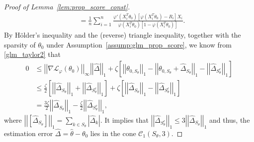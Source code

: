 \documentclass[ejsv2,noshowframe]{imsart}
\theoremstyle{plain}
\theoremstyle{definition}
\theoremstyle{remark}
\newcommand{\norm}[1]{\left|\left| #1 \right|\right|}
\renewcommand{\hat}{\widehat}
\begin{document}
\begin{proof}[Proof of Lemma~\ref{lem:prop_score_const}]
\begin{align*}
		&= \frac{1}{n} \sum_{i=1}^n \frac{\varphi'(X_i^T\theta_0)\left[\varphi(X_i^T\theta_0) -R_i\right] X_i}{\varphi(X_i^T\theta_0) \left[1- \varphi(X_i^T\theta_0)\right]}.
	\end{align*}
	By H{\"o}lder's inequality and the (reverse) triangle inequality, together with the sparsity of $\theta_0$ under Assumption~\ref{assump:glm_prop_score}, we know from \eqref{glm_taylor2} that
	\begin{align*}
		0 & \leq \norm{\nabla\mathcal{L}_{\varphi}(\theta_0)}_{\infty} \norm{\hat{\Delta}}_1 + \zeta\left[\norm{\theta_{0,S_{\theta}}}_1 - \norm{\theta_{0,S_{\theta}} + \hat{\Delta}_{S_{\theta}}}_1 - \norm{\hat{\Delta}_{S_{\theta}^c}}_1 \right]\\
		&\leq \frac{\zeta}{2} \left[\norm{\hat{\Delta}_{S_{\theta}}}_1 + \norm{\hat{\Delta}_{S_{\theta}^c}}_1\right] + \zeta \left[\norm{\hat{\Delta}_{S_{\theta}}}_1 - \norm{\hat{\Delta}_{S_{\theta}^c}}_1 \right]\\
		&= \frac{3\zeta}{2} \norm{\hat{\Delta}_{S_{\theta}}}_1 - \frac{\zeta}{2} \norm{\hat{\Delta}_{S_{\theta}^c}}_1,
	\end{align*}
	where $\norm{\left[\hat{\Delta}_{S_{\theta}} \right]}_1 = \sum_{k \in S_{\theta}} \left|\hat{\Delta}_k \right|$. It implies that $\norm{\hat{\Delta}_{S_{\theta}^c}}_1 \leq 3 \norm{\hat{\Delta}_{S_{\theta}}}_1$ and thus, the estimation error $\hat{\Delta}=\hat{\theta} -\theta_0$ lies in the cone $\mathcal{C}_1(S_{\theta},3)$. 
	

\end{proof}
\end{document}
